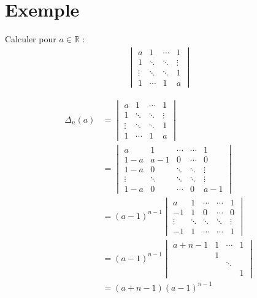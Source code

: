 \documentclass[../main.tex]{subfiles}
\begin{document}
\section{Exemple}
\begin{tcolorbox}[title=Exemple 30.51, title filled=false, colframe=darkgreen, colback=darkgreen!10!white]
    Calculer pour $a\in \mathbb{R}$ : 
    \begin{align*}
        \begin{vmatrix}
            a & 1 & \cdots & 1 \\
            1 & \ddots & \ddots & \vdots \\
            \vdots & \ddots & \ddots & 1 \\
            1 & \cdots & 1 & a
        \end{vmatrix}
    \end{align*}
\end{tcolorbox}

\begin{align*}
    \Delta_n(a) &= \begin{vmatrix}
        a & 1 & \cdots & 1 \\
        1 & \ddots & \ddots & \vdots \\
        \vdots & \ddots & \ddots & 1 \\
        1 & \cdots & 1 & a
    \end{vmatrix} \\
    &= \begin{vmatrix}
        a & 1 & \cdots & \cdots & 1 \\
        1-a & a-1 & 0 & \cdots & 0 \\
        1-a & 0 & \ddots & \ddots & \vdots \\
        \vdots & \ddots & \ddots & \ddots & \vdots \\
        1-a & 0 & \cdots & 0 & a-1
    \end{vmatrix} \\
    &= (a-1)^{n-1} \begin{vmatrix}
        a & 1 & \cdots & \cdots & 1 \\
        -1 & 1 & 0 & \cdots & 0 \\
        \vdots & \ddots & \ddots & \ddots & \vdots \\
        -1 & 1 & \cdots & \cdots & 1
    \end{vmatrix} \\
    &= (a-1)^{n-1} \begin{vmatrix}
        a+n-1 & 1 & \cdots & 1 \\
        & 1 & & \\
        & & \ddots & \\
        & & & 1
    \end{vmatrix} \\
    &= (a+n-1)(a-1)^{n-1}
\end{align*}
\end{document}
